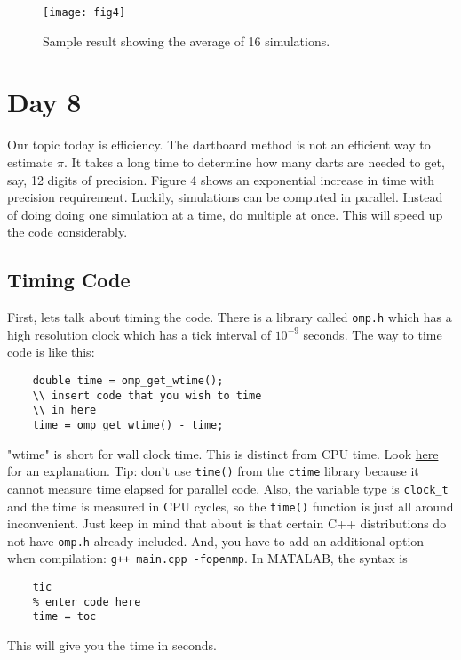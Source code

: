 \documentclass{article}
\begin{document}
\begin{figure}
\centering
\texttt{[image: fig4]}
\caption{Sample result showing the average of 16 simulations.}
\end{figure}

\section{Day 8}
Our topic today is efficiency. The dartboard method is not an efficient way to estimate $\pi$. It takes a long time to determine how many darts are needed to get, say, 12 digits of precision. Figure 4 shows an exponential increase in time with precision requirement. Luckily, simulations can be computed in parallel. Instead of doing doing one simulation at a time, do multiple at once. This will speed up the code considerably.

\subsection{Timing Code}
First, lets talk about timing the code. There is a library called \texttt{omp.h} which has a high resolution clock which has a tick interval of $10^{-9}$ seconds. The way to time code is like this:
\begin{verbatim}
    double time = omp_get_wtime();
    \\ insert code that you wish to time
    \\ in here
    time = omp_get_wtime() - time;
\end{verbatim}
"wtime" is short for wall clock time. This is distinct from CPU time. Look \href{https://stackoverflow.com/questions/10874214/measure-execution-time-in-c-openmp-code}{here} for an explanation. Tip: don't use \texttt{time()} from the \texttt{ctime} library because it cannot measure time elapsed for parallel code. Also, the variable type is \texttt{clock\_t} and the time is measured in CPU cycles, so the \texttt{time()} function is just all around inconvenient. Just keep in mind that about is that certain C++ distributions do not have \texttt{omp.h} already included. And, you have to add an additional option when compilation: \texttt{g++ main.cpp -fopenmp}. In MATALAB, the syntax is
\begin{verbatim}
    tic
    % enter code here
    time = toc
\end{verbatim}
This will give you the time in seconds.
\end{document}
